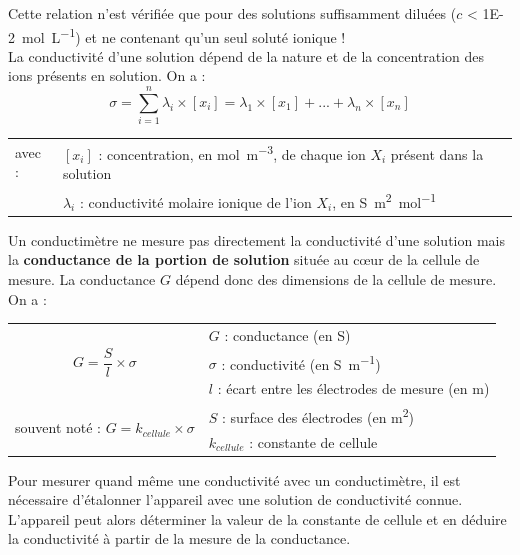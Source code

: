 \documentclass[a4paper,11pt,fleqn]{article}%
\begin{document}
Cette relation n'est vérifiée que pour des solutions suffisamment diluées ($c$  < \SI{1E-2}{\mole\per\liter}) et ne contenant qu'un seul soluté ionique !\\

La conductivité d'une solution dépend de la nature et de la concentration des ions présents en solution. On a :
$$\sigma = \sum_{i=1}^n \lambda_i \times [x_i] = \lambda_1 \times [x_1] + ... +\lambda_n \times [x_n]$$

\begin{table}[h!]
	\begin{tabular}{p{} p{}}
	avec : &$[x_i]$ : concentration, en \unit{\mole\per\meter\cubed}, de chaque ion $X_i$ présent dans la solution\\
	&$\lambda_i$ : conductivité molaire ionique de l'ion $X_i$, en \unit{\siemens\meter\squared\per\mole}\\
\end{tabular}
\end{table}

Un conductimètre ne mesure pas directement la conductivité d'une solution mais la \textbf{conductance de la portion de solution} située au cœur de la cellule de mesure. La conductance $G$ dépend donc des dimensions de la cellule de mesure. On a :

\begin{table}[h!]
	\begin{tabular}{c| p{}}
	\multirow{3}{*}{$G = \dfrac{S}{l} \times \sigma$} & $G$ : conductance (en \unit{\siemens})\\
&$\sigma$ : conductivité (en \unit{\siemens\per\meter})\\
&$l$ : écart entre les électrodes de mesure (en \unit{\meter})\\
\multirow{2}{*}{souvent noté : $ G = k_{cellule} \times \sigma$} & $S$ : surface des électrodes (en \unit{\meter\squared})	\\
&$k_{cellule}$ : constante de cellule\\
\end{tabular}
\end{table}

Pour mesurer quand même une conductivité avec un conductimètre, il est nécessaire d'étalonner l'appareil avec une solution de conductivité connue. L'appareil peut alors déterminer la valeur de la constante de cellule et en déduire la conductivité à partir de la mesure de la conductance.
\end{document}
